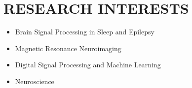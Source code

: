 \documentclass[10pt,a4paper,sans]{moderncv} %
\begin{document}
	
	\makecvtitle
	
	\section{RESEARCH INTERESTS}
    \vspace{0.3em}
	\begin{itemize}

        \item Brain Signal Processing in Sleep and Epilepsy  
        \item Magnetic Resonance Neuroimaging
        \item Digital Signal Processing and Machine Learning
        \item Neuroscience

	\end{itemize}
	
\end{document}
